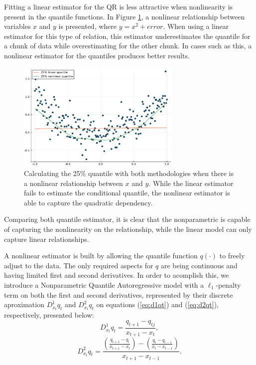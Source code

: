 Fitting a linear estimator for the QR is less attractive when nonlinearity is present in the quantile functions. In Figure \ref{fig:nonlinear}, a nonlinear relationship between variables $x$ and $y$ is presented, where $y = x^2 + error$. When using a linear estimator for this type of relation, this estimator underestimates the quantile for a chunk of data while overestimating for the other chunk. In cases such as this, a nonlinear estimator for the quantiles produces better results.
\begin{figure}[t]
	\begin{center}
	  \includegraphics[width=0.7\textwidth]{Images/nonlinear}
	\end{center}
	\caption{Calculating the 25\% quantile with both methodologies when there is a nonlinear relationship between $x$ and $y$. While the linear estimator fails to estimate the conditional quantile, the nonlinear estimator is able to capture the quadratic dependency.}
	\label{fig:nonlinear}
\end{figure}
Comparing both quantile estimator, it is clear that the nonparametric is capable of capturing the nonlinearity on the relationship, while the linear model can only capture linear relationships.

A nonlinear estimator is built by allowing the quantile function $q(\cdot)$ to freely adjust to the data. The only required aspects for $q$ are being continuous and having limited first and second derivatives.
In order to acomplish this, we introduce a Nonparametric Quantile Autoregressive model with a $\ell_{1}$-penalty term on both the first and second derivatives, represented by their discrete aproximation $D^1_{x_t} q_t$ and $D^2_{x_t} q_t$ on equations (\ref{eq:d1qt}) and (\ref{eq:d2qt}), respectively, presented below:
\begin{equation}
  D^{1}_{x_t}q_t=\frac{q_{t+1}-q_{tj}}{x_{t+1}-x_{t}},\label{eq:d1qt}
\end{equation}
\begin{equation}
D_{x_{t}}^{2}q_{t}=\frac{\left(\frac{q_{t+1}-q_{t}}{x_{t+1}-x_{t}}\right)-\left(\frac{q_{t}-q_{t-1}}{x_{t}-x_{t-1}}\right)}{x_{t+1}- x_{t-1}}.\label{eq:d2qt}
\end{equation}


